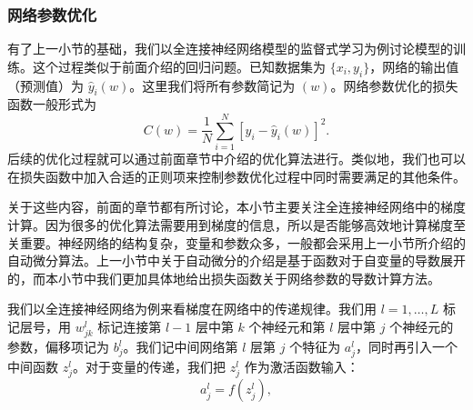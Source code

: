 \subsubsection{网络参数优化}
有了上一小节的基础，我们以全连接神经网络模型的监督式学习为例讨论模型的训练。这个过程类似于前面介绍的回归问题。已知数据集为 $\{x_i,y_i\}$，网络的输出值（预测值）为 $\hat y_i(w)$。这里我们将所有参数简记为 $(w)$。网络参数优化的损失函数一般形式为
\begin{equation}
C(w)=\frac1N\sum_{i=1}^{N}[y_i-\hat y_i(w)]^2.
\tag{8.3.12}
\end{equation}
后续的优化过程就可以通过前面章节中介绍的优化算法进行。类似地，我们也可以在损失函数中加入合适的正则项来控制参数优化过程中同时需要满足的其他条件。

关于这些内容，前面的章节都有所讨论，本小节主要关注全连接神经网络中的梯度计算。因为很多的优化算法需要用到梯度的信息，所以是否能够高效地计算梯度至关重要。神经网络的结构复杂，变量和参数众多，一般都会采用上一小节所介绍的自动微分算法。上一小节中关于自动微分的介绍是基于函数对于自变量的导数展开的，而本小节中我们更加具体地给出损失函数关于网络参数的导数计算方法。

我们以全连接神经网络为例来看梯度在网络中的传递规律。我们用 $l=1,\ldots,L$ 标记层号，用 $w_{jk}^l$ 标记连接第 $l-1$ 层中第 $k$ 个神经元和第 $l$ 层中第 $j$ 个神经元的参数，偏移项记为 $b_j^l$。我们记中间网络第 $l$ 层第 $j$ 个特征为 $a_j^l$，同时再引入一个中间函数 $z_j^l$。对于变量的传递，我们把 $z_j^l$ 作为激活函数输入：
\begin{equation}
a_j^l=f(z_j^l),
\tag{8.3.13}
\end{equation}

